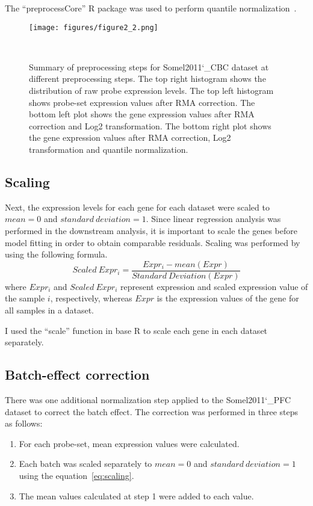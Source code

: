 The ``preprocessCore'' R package was used to perform quantile normalization~\cite{Bolstad2021}.

\begin{figure}[h]
\centering
\texttt{[image: figures/figure2\_2.png]}
\caption{Summary of preprocessing steps for Somel2011\char`_CBC dataset at different preprocessing steps. 
The top right histogram shows the distribution of raw probe expression levels. 
The top left histogram shows probe-set expression values after RMA correction. 
The bottom left plot shows the gene expression values after RMA correction and Log2 transformation.
The bottom right plot shows the gene expression values after RMA correction, Log2 transformation and quantile normalization.}~\label{fig:fig2.2}
\end{figure}

\subsection{Scaling}
Next, the expression levels for each gene for each dataset were scaled to $mean=0$ and $standard\ deviation=1$. 
Since linear regression analysis was performed in the downstream analysis, 
it is important to scale the genes before model fitting in order to obtain comparable residuals.
Scaling was performed by using the following formula.
\begin{equation}
    Scaled\ Expr_i = \frac{Expr_i - mean(Expr)}{Standard\ Deviation(Expr)}
    \label{eq:scaling}
\end{equation}
where $Expr_i$ and $Scaled\ Expr_i$ represent expression and scaled expression value of the sample $i$, respectively, 
whereas $Expr$ is the expression values of the gene for all samples in a dataset.

I used the ``scale'' function in base R to scale each gene in each dataset separately.

\subsection{Batch-effect correction}
There was one additional normalization step applied to the Somel2011\char`_PFC dataset to correct the batch effect.
The correction was performed in three steps as follows:

\begin{enumerate}
    \item For each probe-set, mean expression values were calculated.
    \item Each batch was scaled separately to $mean=0$ and $standard\ deviation=1$ using the equation~\ref{eq:scaling}.
    \item The mean values calculated at step 1 were added to each value.
\end{enumerate}



